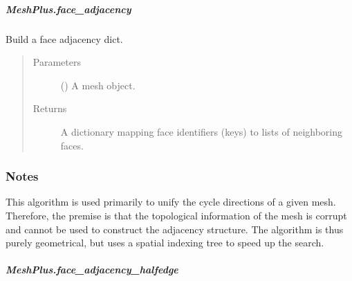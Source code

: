 \documentclass[letterpaper,10pt,english]{sphinxmanual}
\begin{document}
\begin{fulllineitems}
\subparagraph{MeshPlus.face\_adjacency}
\label{\detokenize{api/generated/directional_clustering.mesh.MeshPlus.face_adjacency:meshplus-face-adjacency}}\label{\detokenize{api/generated/directional_clustering.mesh.MeshPlus.face_adjacency::doc}}

\begin{fulllineitems}
\label{\detokenize{api/generated/directional_clustering.mesh.MeshPlus.face_adjacency:directional_clustering.mesh.MeshPlus.face_adjacency}}
Build a face adjacency dict.
\begin{quote}\begin{description}
\item[{Parameters}] \leavevmode
{} () \textendash{} A mesh object.

\item[{Returns}] \leavevmode
{} \textendash{} A dictionary mapping face identifiers (keys) to lists of neighboring faces.

\end{description}\end{quote}
\subsubsection*{Notes}

This algorithm is used primarily to unify the cycle directions of a given mesh.
Therefore, the premise is that the topological information of the mesh is corrupt
and cannot be used to construct the adjacency structure. The algorithm is thus
purely geometrical, but uses a spatial indexing tree to speed up the search.

\end{fulllineitems}



\subparagraph{MeshPlus.face\_adjacency\_halfedge}
\label{\detokenize{api/generated/directional_clustering.mesh.MeshPlus.face_adjacency_halfedge:meshplus-face-adjacency-halfedge}}\label{\detokenize{api/generated/directional_clustering.mesh.MeshPlus.face_adjacency_halfedge::doc}}


\end{fulllineitems}
\end{document}
